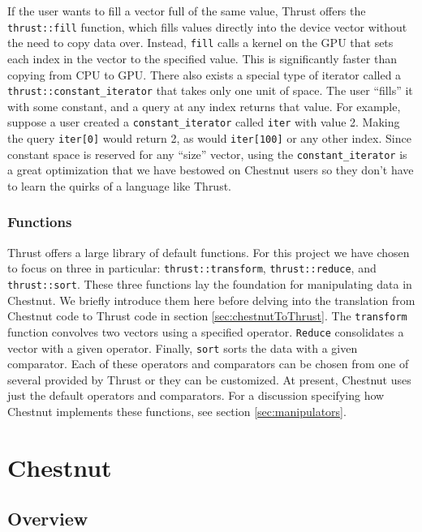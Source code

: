 \documentclass[twocolumn]{article}
\renewcommand{\|}{\origbar} %
\newcommand{\code}[1]{\texttt{#1}}
\begin{document}
If the user wants to fill a vector full of the same value, Thrust offers the \code{thrust::fill} function, which fills values directly into the device vector without the need to copy data over. Instead, \code{fill} calls a kernel on the GPU that sets each index in the vector to the specified value. This is significantly faster than copying from CPU to GPU. There also exists a special type of iterator called a \code{thrust::constant\_iterator} that takes only one unit of space. The user ``fills'' it with some constant, and a query at any index returns that value. For example, suppose a user created a \code{constant\_iterator} called \code{iter} with value 2. Making the query \code{iter[0]} would return 2, as would \code{iter[100]} or any other index. Since constant space is reserved for any ``size'' vector, using  the \code{constant\_iterator} is a great optimization that we have bestowed on Chestnut users so they don't have to learn the quirks of a language like Thrust. 

\subsubsection{Functions}

Thrust offers a large library of default functions. For this project we have chosen to focus on three in particular: \code{thrust::transform}, \code{thrust::reduce}, and \code{thrust::sort}. These three functions lay the foundation for manipulating data in Chestnut. We briefly introduce them here before delving into the translation from Chestnut code to Thrust code in section \ref{sec:chestnutToThrust}. The \code{transform} function convolves two vectors using a specified operator. \code{Reduce} consolidates a vector with a given operator. Finally, \code{sort} sorts the data with a given comparator. Each of these operators and comparators can be chosen from one of several provided by Thrust or they can be customized. At present, Chestnut uses just the default operators and comparators. For a discussion specifying how Chestnut implements these functions, see section \ref{sec:manipulators}.

\section{Chestnut}

\subsection{Overview}
\end{document}
